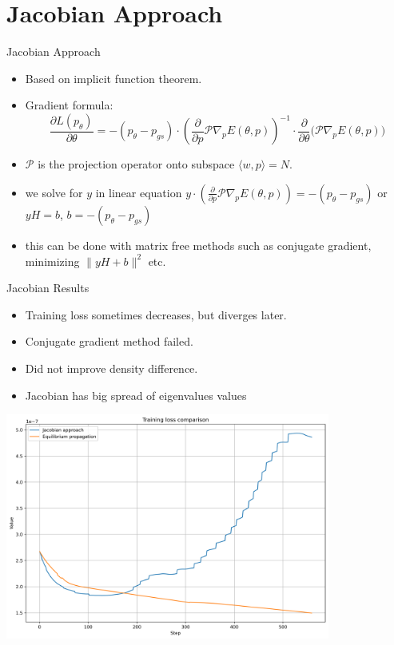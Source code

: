 \documentclass{beamer}
\begin{document}
\section{Jacobian Approach}
\begin{frame}{Jacobian Approach}
  \begin{itemize}
    \item Based on implicit function theorem.
    \item Gradient formula:
    \[
      \frac{\partial L(p_{\theta})}{\partial \theta} = -(p_{\theta}-p_{gs}) \cdot \left(\frac{\partial}{\partial p}\mathcal{P}\nabla_p E(\theta, p)\right)^{-1} \cdot \frac{\partial}{\partial \theta}\big(\mathcal{P}\nabla_p E(\theta, p)\big)
    \]
    \item  $\mathcal{P}$ is the projection operator onto subspace $\langle w,p \rangle = N$.
    \item we solve for $y$ in linear equation $ y \cdot \left(\frac{\partial}{\partial p}\mathcal{P}\nabla_p E(\theta, p)\right) = -(p_{\theta}-p_{gs})$ or $yH = b$, $b =  -(p_{\theta}-p_{gs})$
    \item this can be done with matrix free methods such as conjugate gradient, minimizing $\|yH + b \|^2$ etc.
  \end{itemize}
\end{frame}

\begin{frame}{Jacobian Results}
  \begin{itemize}
    \item Training loss sometimes decreases, but diverges later.
    \item Conjugate gradient method failed.
    \item Did not improve density difference.
    \item Jacobian has big spread of eigenvalues values
  \end{itemize}
\end{frame}

\begin{frame}
 \begin{center}
    \includegraphics[width=0.8\textwidth]{images/loss_comparison.png} %
  \end{center}
\end{frame}
\end{document}
